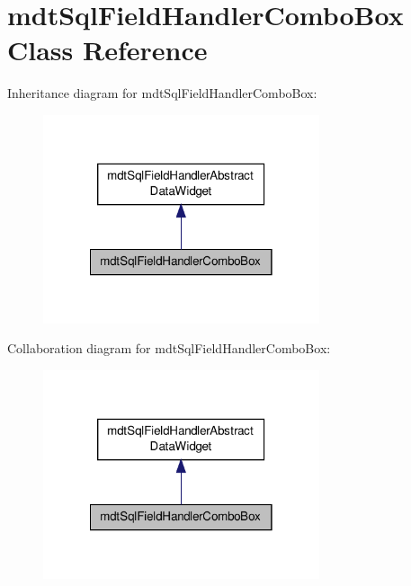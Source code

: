 \hypertarget{classmdt_sql_field_handler_combo_box}{\section{mdt\-Sql\-Field\-Handler\-Combo\-Box Class Reference}
\label{classmdt_sql_field_handler_combo_box}
}


Inheritance diagram for mdt\-Sql\-Field\-Handler\-Combo\-Box\-:\nopagebreak
\begin{figure}[H]
\begin{center}
\leavevmode
\includegraphics[width=230pt]{classmdt_sql_field_handler_combo_box__inherit__graph}
\end{center}
\end{figure}


Collaboration diagram for mdt\-Sql\-Field\-Handler\-Combo\-Box\-:\nopagebreak
\begin{figure}[H]
\begin{center}
\leavevmode
\includegraphics[width=230pt]{classmdt_sql_field_handler_combo_box__coll__graph}
\end{center}
\end{figure}
